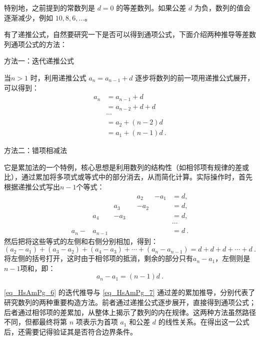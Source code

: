 特别地，之前提到的常数列是 $d = 0$ 的等差数列。如果公差 $d$ 为负，数列的值会逐渐减少，例如 $10, 8, 6, \dots$。

有了递推公式，自然要研究一下是否可以得到通项公式，下面介绍两种推导等差数列通项公式的方法：

方法一：迭代递推公式

当$n>1$ 时，利用递推公式  $a_n = a_{n-1} + d$ 逐步将数列的前一项用递推公式展开，可以得到：
\begin{equation}\label{eq_HsAmPg_6}
\begin{aligned}
a_n &= a_{n-1} + d \\
&= a_{n-2}+d + d\\
&\cdots \\
&= a_2 + (n-2)d\\
&=  a_1 + (n-1)d~.
\end{aligned}
\end{equation}

方法二：错项相减法

它是累加法的一个特例，核心思想是利用数列的结构性（如相邻项有规律的差或比），通过累加将多项式或等式中的部分消去，从而简化计算。实际操作时，首先根据递推公式写出$n-1$个等式：
\begin{equation}\label{eq_HsAmPg_7}
\begin{aligned}
        &        &    & & a_2& -a_1 & = d, \\
        &        &a_3 & &-a_2&      & = d, \\
        &  a_4   &-a_3& &    &      & = d, \\
        &        &    & &    &      &\cdots \\
a_n -   &a_{n-1} &    & &    &      & = d~.
\end{aligned}
\end{equation}
然后把将这些等式的左侧和右侧分别相加，得到：
\begin{equation}
(a_2 - a_1) + (a_3 - a_2) + (a_4 - a_3) + \cdots + (a_n - a_{n-1}) = d + d +d+ \cdots + d~.
\end{equation}
将左侧的括号打开，这时由于相邻项的抵消，剩余的部分只有$a_n-a_1$，左侧则是$n-1$项和，即：
\begin{equation}\label{eq_HsAmPg_8}
a_n -a_1=(n-1)d~.
\end{equation}

\autoref{eq_HsAmPg_6} 的迭代推导与 \autoref{eq_HsAmPg_7} 通过差的累加推导，分别代表了研究数列的两种重要构造方法。前者通过递推公式逐步展开，直接得到通项公式；后者通过相邻项的差累加，从整体上揭示了数列的内在规律。这两种方法虽然路径不同，但都最终将第  $n $ 项表示为首项 $ a_1$  和公差  $d$  的线性关系。在得出这一公式后，还需要记得验证其是否符合边界条件。

